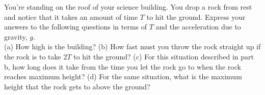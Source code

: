 %
You're standing on the roof of your science building. You drop a rock
from rest and notice that it takes an amount of time $T$ to hit the
ground. Express your answers to the following questions in terms of
$T$ and the acceleration due to gravity, $g$.\\
%
(a) How high is the building?\answercheck\hwendpart
%
(b) How fast must you throw the rock straight
up if the rock is to take $2T$ to hit the
ground?\answercheck\hwendpart
%
(c) For this situation described in part b, how long does it take from the time you let the rock go to
when the rock reaches maximum height?\answercheck\hwendpart
%
(d) For the same situation, what is the maximum height that the rock gets to above the
ground?\answercheck
